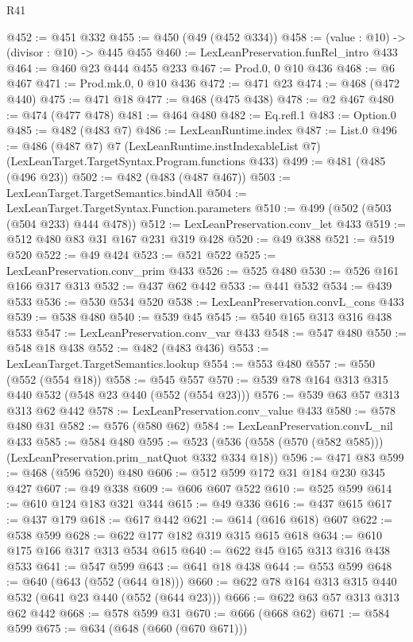 \begin{lexlean}{R41}
\begin{coremodule}
@452 := @451 @332
@455 := @450 (@49 (@452 @334))
@458 := (value : @10) -> (divisor : @10) -> @445 @455
@460 := LexLeanPreservation.funRel_intro @433
@464 := @460 @23 @444 @455 @233
@467 := Prod.{0, 0} @10 @436
@468 := @6 @467
@471 := Prod.mk.{0, 0} @10 @436
@472 := @471 @23
@474 := @468 (@472 @440)
@475 := @471 @18
@477 := @468 (@475 @438)
@478 := @2 @467
@480 := @474 (@477 @478)
@481 := @464 @480
@482 := Eq.refl.{1}
@483 := Option.{0}
@485 := @482 (@483 @7)
@486 := LexLeanRuntime.index
@487 := List.{0}
@496 := @486
    (@487 @7)
    @7
    (LexLeanRuntime.instIndexableList @7)
    (LexLeanTarget.TargetSyntax.Program.functions @433)
@499 := @481 (@485 (@496 @23))
@502 := @482 (@483 (@487 @467))
@503 := LexLeanTarget.TargetSemantics.bindAll
@504 := LexLeanTarget.TargetSyntax.Function.parameters
@510 := @499 (@502 (@503 (@504 @233) @444 @478))
@512 := LexLeanPreservation.conv_let @433
@519 := @512 @480 @83 @31 @167 @231 @319 @428
@520 := @49 @388
@521 := @519 @520
@522 := @49 @424
@523 := @521 @522
@525 := LexLeanPreservation.conv_prim @433
@526 := @525 @480
@530 := @526 @161 @166 @317 @313
@532 := @437 @62 @442
@533 := @441 @532
@534 := @439 @533
@536 := @530 @534 @520
@538 := LexLeanPreservation.convL_cons @433
@539 := @538 @480
@540 := @539 @45
@545 := @540 @165 @313 @316 @438 @533
@547 := LexLeanPreservation.conv_var @433
@548 := @547 @480
@550 := @548 @18 @438
@552 := @482 (@483 @436)
@553 := LexLeanTarget.TargetSemantics.lookup
@554 := @553 @480
@557 := @550 (@552 (@554 @18))
@558 := @545 @557
@570 := @539 @78 @164 @313 @315 @440 @532 (@548 @23 @440 (@552 (@554 @23)))
@576 := @539 @63 @57 @313 @313 @62 @442
@578 := LexLeanPreservation.conv_value @433
@580 := @578 @480 @31
@582 := @576 (@580 @62)
@584 := LexLeanPreservation.convL_nil @433
@585 := @584 @480
@595 := @523 (@536 (@558 (@570 (@582 @585))) (LexLeanPreservation.prim_natQuot @332 @334 @18))
@596 := @471 @83
@599 := @468 (@596 @520) @480
@606 := @512 @599 @172 @31 @184 @230 @345 @427
@607 := @49 @338
@609 := @606 @607 @522
@610 := @525 @599
@614 := @610 @124 @183 @321 @344
@615 := @49 @336
@616 := @437 @615
@617 := @437 @179
@618 := @617 @442
@621 := @614 (@616 @618) @607
@622 := @538 @599
@628 := @622 @177 @182 @319 @315 @615 @618
@634 := @610 @175 @166 @317 @313 @534 @615
@640 := @622 @45 @165 @313 @316 @438 @533
@641 := @547 @599
@643 := @641 @18 @438
@644 := @553 @599
@648 := @640 (@643 (@552 (@644 @18)))
@660 := @622 @78 @164 @313 @315 @440 @532 (@641 @23 @440 (@552 (@644 @23)))
@666 := @622 @63 @57 @313 @313 @62 @442
@668 := @578 @599 @31
@670 := @666 (@668 @62)
@671 := @584 @599
@675 := @634 (@648 (@660 (@670 @671)))

\end{coremodule}
\end{lexlean}
